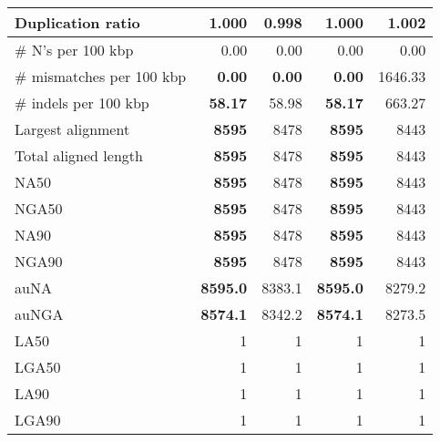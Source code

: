 \documentclass[12pt,a4paper]{article}
\begin{document}
\begin{table}[ht]
\begin{center}
\begin{tabular}{|l*{4}{|r}|}
Duplication ratio & 1.000 & {\bf 0.998} & 1.000 & 1.002 \\ \hline
\# N's per 100 kbp & 0.00 & 0.00 & 0.00 & 0.00 \\ \hline
\# mismatches per 100 kbp & {\bf 0.00} & {\bf 0.00} & {\bf 0.00} & 1646.33 \\ \hline
\# indels per 100 kbp & {\bf 58.17} & 58.98 & {\bf 58.17} & 663.27 \\ \hline
Largest alignment & {\bf 8595} & 8478 & {\bf 8595} & 8443 \\ \hline
Total aligned length & {\bf 8595} & 8478 & {\bf 8595} & 8443 \\ \hline
NA50 & {\bf 8595} & 8478 & {\bf 8595} & 8443 \\ \hline
NGA50 & {\bf 8595} & 8478 & {\bf 8595} & 8443 \\ \hline
NA90 & {\bf 8595} & 8478 & {\bf 8595} & 8443 \\ \hline
NGA90 & {\bf 8595} & 8478 & {\bf 8595} & 8443 \\ \hline
auNA & {\bf 8595.0} & 8383.1 & {\bf 8595.0} & 8279.2 \\ \hline
auNGA & {\bf 8574.1} & 8342.2 & {\bf 8574.1} & 8273.5 \\ \hline
LA50 & 1 & 1 & 1 & 1 \\ \hline
LGA50 & 1 & 1 & 1 & 1 \\ \hline
LA90 & 1 & 1 & 1 & 1 \\ \hline
LGA90 & 1 & 1 & 1 & 1 \\ \hline
\end{tabular}
\end{center}
\end{table}
\end{document}
